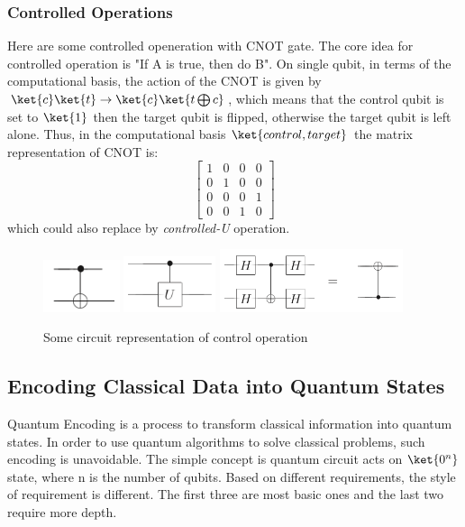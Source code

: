 \subsubsection*{Controlled Operations}
Here are some controlled openeration with CNOT gate. The core 
idea for controlled operation is "If A is true, then do B". On 
single qubit, in terms of the computational basis, the action
of the CNOT is given by $\ket{c} \ket{t} \rightarrow \ket{c} \ket{t \bigoplus c }$,
which means that the control qubit is set to $\ket{1}$ then the target
qubit is flipped, otherwise the target qubit is left alone. Thus, 
in the computational basis $\ket{control, target}$ the matrix representation
of CNOT is: 
\begin{equation}
  \begin{bmatrix}
    1 & 0 & 0 & 0 \\
    0 & 1 & 0 & 0 \\
    0 & 0 & 0 & 1 \\
    0 & 0 & 1 & 0 
  \end{bmatrix}
\end{equation}
which could also replace by \textit{controlled-U} operation. 
\begin{figure}[h]
  \includegraphics[width=0.20\textwidth]{cnot.png}
  \includegraphics[width=0.24\textwidth]{cnot-u.png}
  \includegraphics[width=0.48\textwidth]{cnot-h.png}
  \caption{Some circuit representation of control operation}
\end{figure}
\subsection*{Encoding Classical Data into Quantum States}
Quantum Encoding is a process to transform classical information into quantum 
states. In order to use quantum algorithms to solve classical problems, 
such encoding is unavoidable. The simple concept is quantum circuit acts on 
$\ket{0^n}$ state, where n is the number of qubits. Based on different 
requirements, the style of requirement is different. The first three are 
most basic ones and the last two require more depth. 

